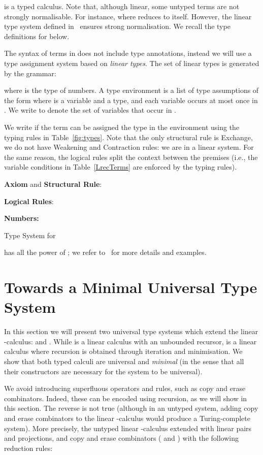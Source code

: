 \documentclass{article}
\begin{document}
\LLCI is a typed calculus. Note that, although linear, some untyped terms are not strongly normalisable. For
instance,  where  reduces to itself. 
However, the linear type system defined in~\cite{AlvesS:TCS} ensures strong normalisation. We recall the type definitions for \LLCI below.

The syntax of terms in  does not include type annotations,
instead we will use a type assignment system based on \emph{linear
  types}.  The set of linear types is generated by the grammar:

where  is the type of numbers. A type environment  is a
list of type assumptions of the form  where  is a variable and
 a type, and each variable occurs at most once in .  We
write  to denote the set of variables that occur in
.

We write  if the term 
can be assigned the type  in the environment  using the
typing rules in Table~\ref{fig:types}.  Note that the only structural
rule is Exchange, we do not have Weakening and Contraction rules: we
are in a linear system.  For the same reason, the logical rules split
the context between the premises (i.e., the variable conditions in
Table~\ref{LrecTerms} are enforced by the typing rules).
\begin{table*}
{
{\bf Axiom} and {\bf Structural Rule}:

{\bf Logical Rules}:


{\bf Numbers:}

}
\caption{Type System for \LLCI}\label{fig:types}
\end{table*}

\LLCI has all the power of \ST; we refer
to~\cite{AlvesS:TCS} for more details and examples.

\section{Towards a Minimal Universal Type System}\label{sec:minimal}
In this section we will present two universal type systems which extend the linear -calculus:  and . While  is a linear calculus with an unbounded recursor,  is a linear calculus where recursion is obtained through iteration and minimisation. We show that both typed calculi are universal and \emph{minimal} (in the sense that all their constructors are necessary for the system to be universal).  

We avoid introducing superfluous operators and rules, such as copy and erase combinators. Indeed, these can be encoded using recursion, as we will show in this section. The reverse is not true (although in an untyped system, adding copy and erase combinators to the linear -calculus would produce a Turing-complete system). More precisely, the untyped linear -calculus extended with linear pairs and projections, and copy and erase combinators ( and ) with the following reduction rules:
 
\end{document}

